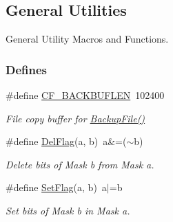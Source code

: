 \hypertarget{group__utilities}{\subsection{General Utilities}
\label{group__utilities}
}


General Utility Macros and Functions.  


\subsubsection*{Defines}
\begin{DoxyCompactItemize}
\item 
\hypertarget{group__utilities_ga4211f4b332e79ab5f3c691a4ab6ebaf9}{\#define \hyperlink{group__utilities_ga4211f4b332e79ab5f3c691a4ab6ebaf9}{C\-F\-\_\-\-B\-A\-C\-K\-B\-U\-F\-L\-E\-N}~102400}\label{group__utilities_ga4211f4b332e79ab5f3c691a4ab6ebaf9}

\begin{DoxyCompactList}\small\item\em File copy buffer for \hyperlink{group__utilities_ga0fccda7427db33b2f73a3b6dca864207}{Backup\-File()} \end{DoxyCompactList}\item 
\hypertarget{group__utilities_gabfbf02b37e47027916f3352798f7d44c}{\#define \hyperlink{group__utilities_gabfbf02b37e47027916f3352798f7d44c}{Del\-Flag}(a, b)~a\&=($\sim$b)}\label{group__utilities_gabfbf02b37e47027916f3352798f7d44c}

\begin{DoxyCompactList}\small\item\em Delete bits of Mask {\ttfamily b} from Mask {\ttfamily a}. \end{DoxyCompactList}\item 
\hypertarget{group__utilities_gafcc4d6e712f81df21ea69277d42af839}{\#define \hyperlink{group__utilities_gafcc4d6e712f81df21ea69277d42af839}{Set\-Flag}(a, b)~a$|$=b}\label{group__utilities_gafcc4d6e712f81df21ea69277d42af839}

\begin{DoxyCompactList}\small\item\em Set bits of Mask {\ttfamily b} in Mask {\ttfamily a}. \end{DoxyCompactList}\end{DoxyCompactItemize}
